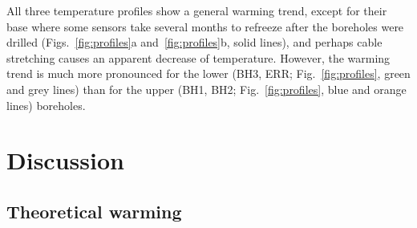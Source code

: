 \documentclass[utf8]{article}
\begin{document}
    All three temperature profiles show a general warming trend, except for
    their base where some sensors take several months to refreeze after the
    boreholes were drilled (Figs.~\ref{fig:profiles}a and~\ref{fig:profiles}b,
    solid lines), and perhaps cable stretching causes an apparent decrease of
    temperature. However, the warming trend is much more pronounced for the
    lower (BH3, ERR; Fig.~\ref{fig:profiles}, green and grey lines) than for
    the upper (BH1, BH2; Fig.~\ref{fig:profiles}, blue and orange lines)
    boreholes.


\section{Discussion}

\subsection{Theoretical warming}
\end{document}
